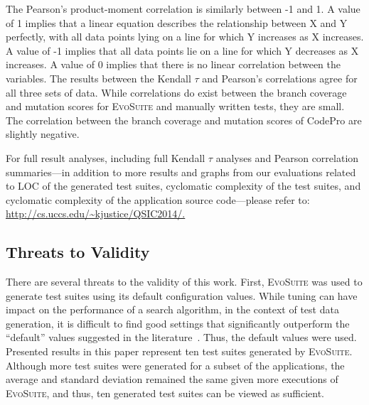 The Pearson's product-moment correlation is similarly between -1 and 1.  A value of 1 implies that a linear equation
describes the relationship between X and Y perfectly, with all data points lying on a line for which Y increases as X
increases.  A value of -1 implies that all data points lie on a line for which Y decreases as X increases. A value of 0
implies that there is no linear correlation between the variables. The results between the Kendall $\tau$ and Pearson's
correlations agree for all three sets of data.  While correlations do exist between the branch coverage and mutation
scores for \textsc{EvoSuite} and manually written tests, they are small.  The correlation between the branch coverage
and mutation scores of CodePro are slightly negative.  



For full result analyses, including full Kendall $\tau$ analyses and Pearson correlation summaries---in addition to more
results and graphs from our evaluations related to LOC of the generated test suites, cyclomatic complexity of the test
suites, and cyclomatic complexity of the application source code---please refer to: \url{http://cs.uccs.edu/~kjustice/QSIC2014/.}

\subsection{Threats to Validity}

There are several threats to the validity of this work.  First, \textsc{EvoSuite} was used to generate test suites using its default configuration values. While tuning can have impact on the performance of a search algorithm, in the context of test data generation, it is difficult to find good settings that significantly outperform the ``default'' values suggested in the literature~\cite{arcuri2013}.  Thus, the default values were used.  Presented results in this paper represent ten test suites generated by \textsc{EvoSuite}.  Although more test suites were generated for a subset of the applications, the average and standard deviation remained the same given more executions of \textsc{EvoSuite}, and thus, ten generated test suites can be viewed as sufficient.

